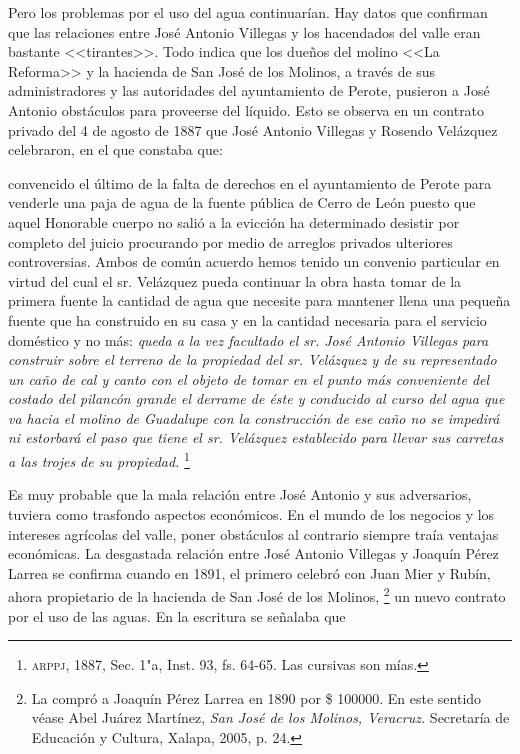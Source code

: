 \documentclass[14pt,twoside,final]{extbook} %
\let\oldfootnote\footnote
\renewcommand\footnote[1]{%
\oldfootnote{\hspace{1mm}#1}}
\begin{document}
Pero los problemas por el uso del agua continuarían. Hay datos que confirman que las relaciones entre José Antonio Villegas y los hacendados del valle eran bastante <<tirantes>>. Todo indica que los dueños del molino <<La Reforma>> y la hacienda de San José de los Molinos, a través de sus administradores y las autoridades del ayuntamiento de Perote, pusieron a José Antonio obstáculos para proveerse del líquido. Esto se observa en un contrato privado del 4 de agosto de 1887 que José Antonio Villegas y Rosendo Velázquez celebraron, en el que constaba que:
\begin{quoting}
convencido el último de la falta de derechos en el ayuntamiento de Perote para venderle una paja de agua de la fuente pública de Cerro de León puesto que aquel Honorable cuerpo no salió a la evicción ha determinado desistir por completo del juicio procurando por medio de arreglos privados ulteriores controversias. Ambos de común acuerdo hemos tenido un convenio particular en virtud del cual el sr. Velázquez pueda continuar la obra hasta tomar de la primera fuente la cantidad de agua que necesite para mantener llena una pequeña fuente que ha construido en su casa y en la cantidad necesaria para el servicio doméstico y no más: \emph{queda a la vez facultado el sr. José Antonio Villegas para construir sobre el terreno de la propiedad del sr. Velázquez y de su representado un caño de cal y canto con el objeto de tomar en el punto más conveniente del costado del pilancón grande el derrame de éste y conducido al curso del agua que va hacia el molino de Guadalupe con la construcción de ese caño no se impedirá ni estorbará el paso que tiene el sr. Velázquez establecido para llevar sus carretas a las trojes de su propiedad.}\footnote{\textsc{arppj}, 1887, Sec. 1"a, Inst. 93, fs. 64-65. Las cursivas son mías.}
\end{quoting}
Es muy probable que la mala relación entre José Antonio y sus adversarios, tuviera como trasfondo aspectos económicos. En el mundo de los negocios y los intereses agrícolas del valle, poner obstáculos al contrario siempre traía ventajas económicas. La desgastada relación entre José Antonio Villegas y Joaquín Pérez Larrea se confirma cuando en 1891, el primero celebró con Juan Mier y Rubín, ahora propietario de la hacienda de San José de los Molinos,\footnote{La compró a Joaquín Pérez Larrea en 1890 por \$ 100000. En este sentido véase Abel Juárez Martínez, \emph{San José de los Molinos, Veracruz.} Secretaría de Educación y Cultura, Xalapa, 2005, p. 24.} un nuevo contrato por el uso de las aguas. En la escritura se señalaba que
\end{document}
